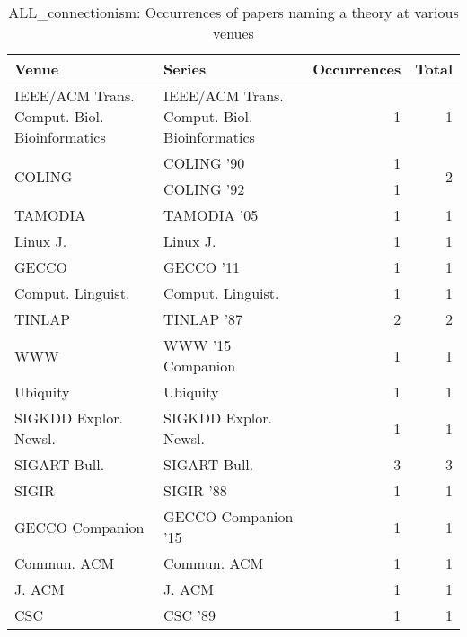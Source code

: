 \begin{table*}[t]
\begin{tabular}{llrr}
Venue & Series & Occurrences & Total\\\hline
\multirow{1}{*}{IEEE/ACM Trans. Comput. Biol. Bioinformatics} & IEEE/ACM Trans. Comput. Biol. Bioinformatics & 1 & \multirow{1}{*}{1}\\
\multirow{2}{*}{COLING } & COLING '90 & 1 & \multirow{2}{*}{2}\\
& COLING '92 & 1 &\\
\multirow{1}{*}{TAMODIA } & TAMODIA '05 & 1 & \multirow{1}{*}{1}\\
\multirow{1}{*}{Linux J.} & Linux J. & 1 & \multirow{1}{*}{1}\\
\multirow{1}{*}{GECCO } & GECCO '11 & 1 & \multirow{1}{*}{1}\\
\multirow{1}{*}{Comput. Linguist.} & Comput. Linguist. & 1 & \multirow{1}{*}{1}\\
\multirow{1}{*}{TINLAP } & TINLAP '87 & 2 & \multirow{1}{*}{2}\\
\multirow{1}{*}{WWW } & WWW '15 Companion & 1 & \multirow{1}{*}{1}\\
\multirow{1}{*}{Ubiquity} & Ubiquity & 1 & \multirow{1}{*}{1}\\
\multirow{1}{*}{SIGKDD Explor. Newsl.} & SIGKDD Explor. Newsl. & 1 & \multirow{1}{*}{1}\\
\multirow{1}{*}{SIGART Bull.} & SIGART Bull. & 3 & \multirow{1}{*}{3}\\
\multirow{1}{*}{SIGIR } & SIGIR '88 & 1 & \multirow{1}{*}{1}\\
\multirow{1}{*}{GECCO Companion } & GECCO Companion '15 & 1 & \multirow{1}{*}{1}\\
\multirow{1}{*}{Commun. ACM} & Commun. ACM & 1 & \multirow{1}{*}{1}\\
\multirow{1}{*}{J. ACM} & J. ACM & 1 & \multirow{1}{*}{1}\\
\multirow{1}{*}{CSC } & CSC '89 & 1 & \multirow{1}{*}{1}\\
\end{tabular}
\caption{ALL\_connectionism: Occurrences of papers naming a theory at various venues}
\end{table*}